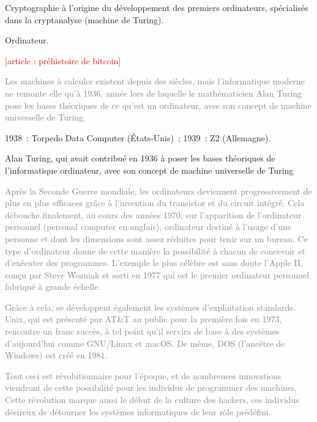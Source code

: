 Cryptographie à l'origine du développement des premiers ordinateurs, spécialisés dans la cryptanalyse (machine de Turing).

Ordinateur.


\textcolor{red}{[article : préhistoire de bitcoin]}

\textcolor{gray}{Les machines à calculer existent depuis des siècles, mais l'informatique moderne ne remonte elle qu'à 1936, année lors de laquelle le mathématicien Alan Turing pose les bases théoriques de ce qu'est un ordinateur, avec son concept de machine universelle de Turing.}


1938~: Torpedo Data Computer (États-Unis)~; 1939~: Z2 (Allemagne).

Alan Turing, qui avait contribué en 1936 à poser les bases théoriques de l'informatique ordinateur, avec son concept de machine universelle de Turing

\textcolor{gray}{Après la Seconde Guerre mondiale, les ordinateurs deviennent progressivement de plus en plus efficaces grâce à l'invention du transistor et du circuit intégré. Cela débouche finalement, au cours des années 1970, sur l'apparition de l'ordinateur personnel (personal computer en anglais), ordinateur destiné à l'usage d'une personne et dont les dimensions sont assez réduites pour tenir sur un bureau. Ce type d'ordinateur donne de cette manière la possibilité à chacun de concevoir et d'exécuter des programmes. L'exemple le plus célèbre est sans doute l'Apple II, conçu par Steve Wozniak et sorti en 1977 qui est le premier ordinateur personnel fabriqué à grande échelle.}

\textcolor{gray}{Grâce à cela, se développent également les systèmes d'exploitation standards. Unix, qui est présenté par AT\&T au public pour la première fois en 1973, rencontre un franc succès, à tel point qu'il servira de base à des systèmes d'aujourd'hui comme GNU/Linux et macOS. De même, DOS (l'ancêtre de Windows) est créé en 1981.}

\textcolor{gray}{Tout ceci est révolutionnaire pour l'époque, et de nombreuses innovations viendront de cette possibilité pour les individus de programmer des machines. Cette révolution marque aussi le début de la culture des hackers, ces individus désireux de détourner les systèmes informatiques de leur rôle prédéfini.}

